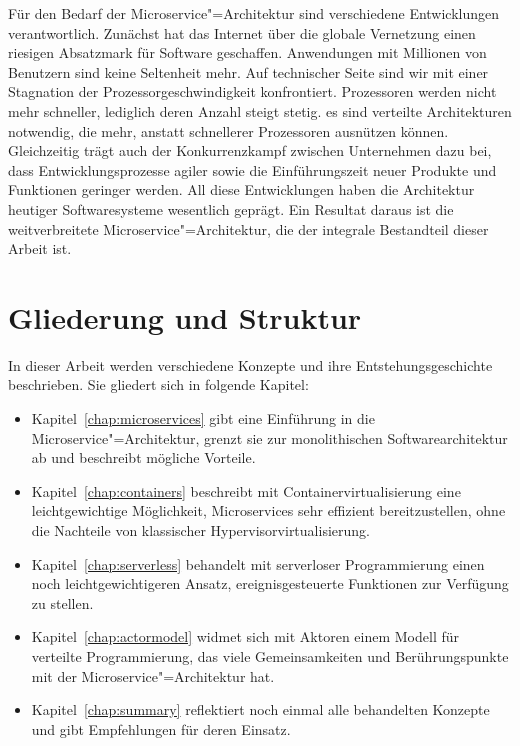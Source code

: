 Für den Bedarf der Microservice"=Architektur sind verschiedene Entwicklungen verantwortlich. Zunächst hat das Internet über die globale Vernetzung einen riesigen Absatzmark für Software geschaffen. Anwendungen mit Millionen von Benutzern sind keine Seltenheit mehr. Auf technischer Seite sind wir mit einer Stagnation der Prozessorgeschwindigkeit konfrontiert. Prozessoren werden nicht mehr schneller, lediglich deren Anzahl steigt stetig. \Dah es sind verteilte Architekturen notwendig, die mehr, anstatt schnellerer Prozessoren ausnützen können. Gleichzeitig trägt auch der Konkurrenzkampf zwischen Unternehmen dazu bei, dass Entwicklungsprozesse agiler sowie die Einführungszeit neuer Produkte und Funktionen geringer werden. All diese Entwicklungen haben die Architektur heutiger Softwaresysteme wesentlich geprägt. Ein Resultat daraus ist die weitverbreitete Microservice"=Architektur, die der integrale Bestandteil dieser Arbeit ist.

\section{Gliederung und Struktur}

In dieser Arbeit werden verschiedene Konzepte und ihre Entstehungsgeschichte beschrieben. Sie gliedert sich in folgende Kapitel:

\begin{itemize}
	\item Kapitel~\ref{chap:microservices} gibt eine Einführung in die Microservice"=Architektur, grenzt sie zur monolithischen Softwarearchitektur ab und beschreibt mögliche Vorteile.
	\item Kapitel~\ref{chap:containers} beschreibt mit Containervirtualisierung eine leichtgewichtige Möglichkeit, Microservices sehr effizient bereitzustellen, ohne die Nachteile von klassischer Hypervisorvirtualisierung.
	\item Kapitel~\ref{chap:serverless} behandelt mit serverloser Programmierung einen noch leichtgewichtigeren Ansatz, ereignisgesteuerte Funktionen zur Verfügung zu stellen. 
	\item Kapitel~\ref{chap:actormodel} widmet sich mit Aktoren einem Modell für verteilte Programmierung, das viele Gemeinsamkeiten und Berührungspunkte mit der Microservice"=Architektur hat.
	\item Kapitel~\ref{chap:summary} reflektiert noch einmal alle behandelten Konzepte und gibt Empfehlungen für deren Einsatz.
\end{itemize}

